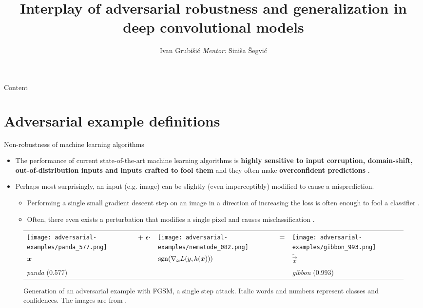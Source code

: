 \documentclass{beamer}
\title{Interplay of adversarial robustness and generalization in deep convolutional models}
\author{Ivan Grubišić \newline \emph{Mentor:} Siniša Šegvić}
\institute{Faculty of Electrical Engineering and Computing}
\date{}
\begin{document}
	
\begin{frame}
  \titlepage
\end{frame}

\begin{frame}{Content}
  \tableofcontents
\end{frame}


\section{Adversarial example definitions}

\begin{frame}{Non-robustness of machine learning algorithms}
	\begin{itemize}
		\item The performance of current state-of-the-art machine learning algorithms is \textbf{highly sensitive to input corruption, domain-shift, out-of-distribution inputs and inputs crafted to fool them} and they often make \textbf{overconfident predictions} \citep{Hendrycks:2016:BDMOODE,Ganin:2015:UDAB,Nguyen:2015:DNNEFHCPUI,Hendrycks:2019:BNNRCCP,Engstrom:2017:RTSFCST,Szegedy:2013:IPNN}.
		\item Perhaps most surprisingly, an input (e.g. image) can be slightly (even imperceptibly) modified to cause a misprediction.
		\begin{itemize}
		    \item Performing a single small gradient descent step on an image in a direction of increasing the loss is often enough to fool a classifier \citep{Goodfellow:2014:EHAE}. 	
		    \item Often, there even exists a perturbation that modifies a single pixel and causes misclassification \cite{Su:2017:OPAFDNN}. 	
	    \end{itemize}
	\end{itemize}
	\begin{figure}[htbp!]
	\centering
	{\small
		\begin{tabular}{>{\centering\arraybackslash}m{}m{.1in}>{\centering\arraybackslash}m{}m{.05in}>{\centering\arraybackslash}m{}}
			\centering\arraybackslash
			\texttt{[image: adversarial-examples/panda\_577.png]} &%
			\centering\arraybackslash%
			$\centering +\ \epsilon \cdot$ &%
			\texttt{[image: adversarial-examples/nematode\_082.png]} &%
			$\centering =$ & %
			\texttt{[image: adversarial-examples/gibbon\_993.png]} \\
			$\centering \vec x$     &%
			& $\sgn\del{\nabla_{\vec x} L(y,h(\vec x))}$ & & $\tilde{\vec x}$ \\
			\emph{panda} (0.577) & & & & \emph{gibbon} (0.993) 
		\end{tabular}
	}
	\caption{Generation of an adversarial example with FGSM, a single step attack. Italic words and numbers represent classes and confidences. The images are from \citet{Goodfellow:2014:EHAE}.}
	\label{fig:fgsm-adversarial-example}
\end{figure}
\end{frame}
\end{document}
